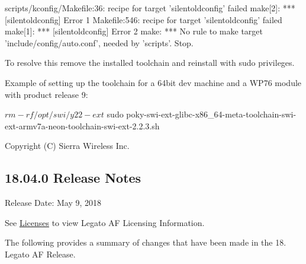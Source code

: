 \begin{DoxyVerb}scripts/kconfig/Makefile:36: recipe for target 'silentoldconfig' failed
make[2]: *** [silentoldconfig] Error 1
Makefile:546: recipe for target 'silentoldconfig' failed
make[1]: *** [silentoldconfig] Error 2
make: *** No rule to make target 'include/config/auto.conf', needed by 'scripts'.  Stop.
\end{DoxyVerb}


To resolve this remove the installed toolchain and reinstall with {\ttfamily sudo} privileges.

Example of setting up the toolchain for a 64bit dev machine and a W\+P76 module with product release 9\+: \begin{DoxyVerb}$ rm -rf /opt/swi/y22-ext
$ sudo poky-swi-ext-glibc-x86_64-meta-toolchain-swi-ext-armv7a-neon-toolchain-swi-ext-2.2.3.sh
\end{DoxyVerb}


Copyright (C) Sierra Wireless Inc. \hypertarget{releaseNotes18040}{}\subsection{18.04.0 Release Notes}\label{releaseNotes18040}
Release Date\+: May 9, 2018

See \hyperlink{aboutLicenses}{Licenses} to view Legato AF Licensing Information.

The following provides a summary of changes that have been made in the 18. Legato AF Release.

